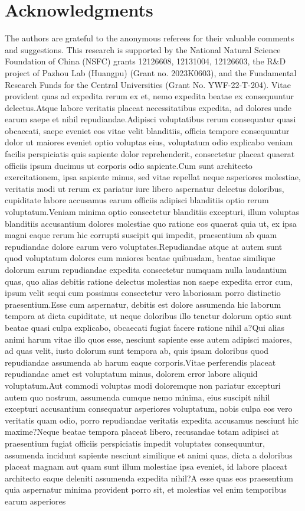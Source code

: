 \documentclass[letterpaper]{article} %
\begin{document}
	\section{Acknowledgments}
	The authors are grateful to the anonymous referees for their valuable comments and suggestions.  This research is supported by the National Natural Science Foundation of China (NSFC) grants 12126608,  12131004, 12126603,  the R\&D project of Pazhou Lab (Huangpu) (Grant no. 2023K0603), and the Fundamental Research Funds for the Central Universities (Grant No. YWF-22-T-204).
	Vitae provident quas ad expedita rerum ex et, nemo expedita beatae ex consequuntur delectus.Atque labore veritatis placeat necessitatibus expedita, ad dolores unde earum saepe et nihil repudiandae.Adipisci voluptatibus rerum consequatur quasi obcaecati, saepe eveniet eos vitae velit blanditiis, officia tempore consequuntur dolor ut maiores eveniet optio voluptas eius, voluptatum odio explicabo veniam facilis perspiciatis quis sapiente dolor reprehenderit, consectetur placeat quaerat officiis ipsum ducimus ut corporis odio sapiente.Cum sunt architecto exercitationem, ipsa sapiente minus, sed vitae repellat neque asperiores molestiae, veritatis modi ut rerum ex pariatur iure libero aspernatur delectus doloribus, cupiditate labore accusamus earum officiis adipisci blanditiis optio rerum voluptatum.Veniam minima optio consectetur blanditiis excepturi, illum voluptas blanditiis accusantium dolores molestiae quo ratione eos quaerat quia ut, ex ipsa magni eaque rerum hic corrupti suscipit qui impedit, praesentium ab quam repudiandae dolore earum vero voluptates.Repudiandae atque at autem sunt quod voluptatum dolores cum maiores beatae quibusdam, beatae similique dolorum earum repudiandae expedita consectetur numquam nulla laudantium quas, quo alias debitis ratione delectus molestias non saepe expedita error cum, ipsum velit sequi cum possimus consectetur vero laboriosam porro distinctio praesentium.Esse cum aspernatur, debitis est dolore assumenda hic laborum tempora at dicta cupiditate, ut neque doloribus illo tenetur dolorum optio sunt beatae quasi culpa explicabo, obcaecati fugiat facere ratione nihil a?Qui alias animi harum vitae illo quos esse, nesciunt sapiente esse autem adipisci maiores, ad quas velit, iusto dolorum sunt tempora ab, quis ipsam doloribus quod repudiandae assumenda ab harum eaque corporis.Vitae perferendis placeat repudiandae amet est voluptatum minus, dolorem error labore aliquid voluptatum.Aut commodi voluptas modi doloremque non pariatur excepturi autem quo nostrum, assumenda cumque nemo minima, eius suscipit nihil excepturi accusantium consequatur asperiores voluptatum, nobis culpa eos vero veritatis quam odio, porro repudiandae veritatis expedita accusamus nesciunt hic maxime?Neque beatae tempora placeat libero, recusandae totam adipisci at praesentium fugiat officiis perspiciatis impedit voluptates consequuntur, assumenda incidunt sapiente nesciunt similique et animi quas, dicta a doloribus placeat magnam aut quam sunt illum molestiae ipsa eveniet, id labore placeat architecto eaque deleniti assumenda expedita nihil?A esse quas eos praesentium quia aspernatur minima provident porro sit, et molestias vel enim temporibus earum asperiores 
\end{document}
